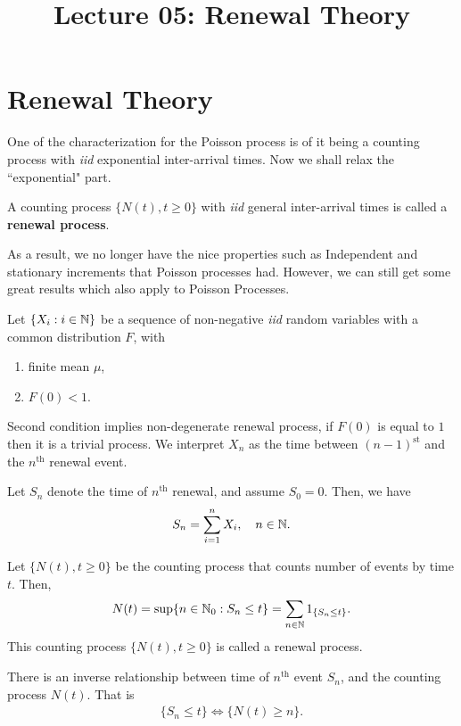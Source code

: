 \documentclass[a4paper,10pt, english]{article}
\title{Lecture 05: Renewal Theory}
\author{}
\begin{document}
\maketitle

\section{Renewal Theory}
One of the characterization for the Poisson process is of it being a counting process with \emph{iid} exponential inter-arrival times. Now we shall relax the ``exponential" part. 
\begin{defn} A counting process $\{N(t),t \geq 0\}$ with \emph{iid} general inter-arrival times is called a \textbf{renewal process}.
\end{defn}
As a result, we no longer have the nice properties such as Independent and stationary increments that Poisson processes had. However, we can still get some great results which also apply to Poisson Processes. 

\begin{defn} Let $\{X_i: i \in \mathbb{N}\}$ be a sequence of non-negative \emph{iid} random variables with a common distribution $F$, with 
	\begin{enumerate}
		\item finite mean $\mu$, %
		\item $F(0) < 1$.%
	\end{enumerate}
\end{defn}
Second condition implies non-degenerate renewal process, if $F(0)$ is equal to $1$ then it is a trivial process. We interpret $X_n$ as the time between $(n - 1)^{\text{st}}$ and the $n^{\text{th}}$ renewal event. 

\begin{defn} Let $S_n$ denote the time of $n^{\text{th}}$ renewal, and assume $S_0 = 0$. Then, we have
\begin{align*} 
S_n = \sum_{i=1}^n X_i, \quad n\in \mathbb{N}. 
\end{align*}
\end{defn}
\begin{defn} Let $\{N(t), t \geq 0\}$ be the counting process that counts number of events by time $t$. Then,
	\begin{align*} 
	N(t) = \sup\{n \in \mathbb{N}_0 : S_n \leq t\} = \sum_{n \in \mathbb{N}}1_{\{S_n \leq t\}}.
	\end{align*} 
	This counting process $\{N(t), t \geq 0\}$ is called a renewal process.
\end{defn}
\begin{lem}
	There is an inverse relationship between time of $n^{\text{th}}$ event $S_n$, and the counting process $N(t)$. That is
	\begin{align}
	\label{eq:InverseRelationship}
	\{S_n \leq t\} \iff \{N(t) \geq n\}.
	\end{align}
\end{lem}
\end{document}
